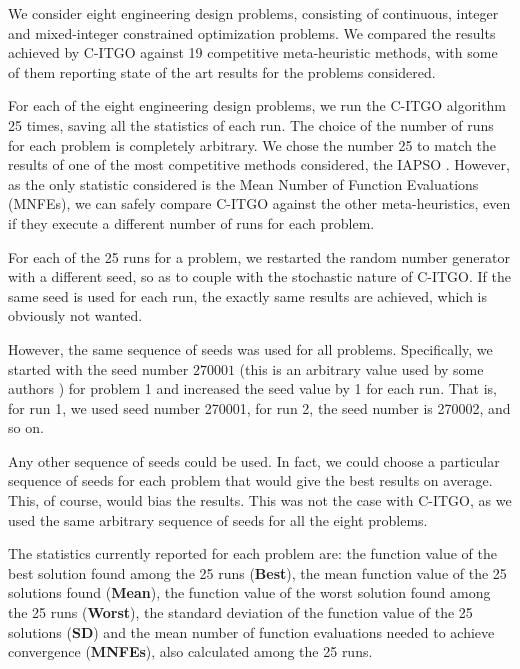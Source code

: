 \begin{revAns}
We consider eight engineering design problems, consisting of continuous, integer and mixed-integer constrained optimization problems. We compared the results achieved by C-ITGO against 19 competitive meta-heuristic methods, with some of them reporting state of the art results for the problems considered.

For each of the eight engineering design problems, we run the C-ITGO algorithm 25 times, saving all the statistics of each run. The choice of the number of runs for each problem is completely arbitrary. We chose the number 25 to match the results of one of the most competitive methods considered, the IAPSO \citep{IAPSO}. However, as the only statistic considered is the Mean Number of Function Evaluations (MNFEs), we can safely compare C-ITGO against the other meta-heuristics, even if they execute a different number of runs for each problem.

For each of the 25 runs for a problem, we restarted the random number generator with a different seed, so as to couple with the stochastic nature of C-ITGO. If the same seed is used for each run, the exactly same results are achieved, which is obviously not wanted.

However, the same sequence of seeds was used for all problems. Specifically, we started with the seed number $270001$ (this is an arbitrary value used by some authors \citep{BRKGABB}) for problem 1 and increased the seed value by 1 for each run. That is, for run 1, we used seed number 270001, for run 2, the seed number is 270002, and so on.

Any other sequence of seeds could be used. In fact, we could choose a particular sequence of seeds for each problem that would give the best results on average. This, of course, would bias the results. This was not the case with C-ITGO, as we used the same arbitrary sequence of seeds for all the eight problems.

The statistics currently reported for each problem are: the function value of the best solution found among the 25 runs (\textbf{Best}), the mean function value of the 25 solutions found (\textbf{Mean}), the function value of the worst solution found among the 25 runs (\textbf{Worst}), the standard deviation of the function value of the 25 solutions (\textbf{SD}) and the mean number of function evaluations needed to achieve convergence (\textbf{MNFEs}), also calculated among the 25 runs.



\end{revAns}
